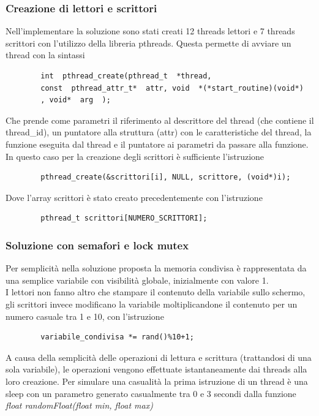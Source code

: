 \documentclass[10pt]{beamer}
\begin{document}

\begin{frame}[fragile]
	\frametitle{Creazione di lettori e scrittori}
	Nell'implementare la soluzione sono stati creati 12 threads lettori e 7 threads scrittori con l'utilizzo della libreria pthreads. Questa permette di avviare un thread con la sintassi
	\begin{verbatim}
		int  pthread_create(pthread_t  *thread,
		const  pthread_attr_t*  attr, void  *(*start_routine)(void*)
		, void*  arg  );
	\end{verbatim}
	Che prende come parametri il riferimento al descrittore del thread (che contiene il thread\_id), un puntatore alla struttura (attr) con le caratteristiche del thread, la funzione eseguita dal thread e il puntatore ai parametri da passare alla funzione.
	\\In questo caso per la creazione degli scrittori è sufficiente l'istruzione 
	\begin{verbatim}
		pthread_create(&scrittori[i], NULL, scrittore, (void*)i);
	\end{verbatim}
	Dove l'array scrittori è stato creato precedentemente con l'istruzione
	\begin{verbatim}
		pthread_t scrittori[NUMERO_SCRITTORI];
	\end{verbatim}
\end{frame}

\begin{frame}[fragile]
	\frametitle{Soluzione con semafori e lock mutex}
	Per semplicità nella soluzione proposta la memoria condivisa è rappresentata da una semplice variabile con visibilità globale, inizialmente con valore 1.
	\\I lettori non fanno altro che stampare il contenuto della variabile sullo schermo, gli scrittori invece modificano la variabile moltiplicandone il contenuto per un numero casuale tra 1 e 10, con l'istruzione
	\begin{verbatim}
		variabile_condivisa *= rand()%10+1;
	\end{verbatim}
	A causa della semplicità delle operazioni di lettura e scrittura (trattandosi di una sola variabile), le operazioni vengono effettuate istantaneamente dai threads alla loro creazione. Per simulare una casualità la prima istruzione di un thread è una sleep con un parametro generato casualmente tra 0 e 3 secondi dalla funzione \emph{float randomFloat(float min, float max)}
\end{frame}
\end{document}
